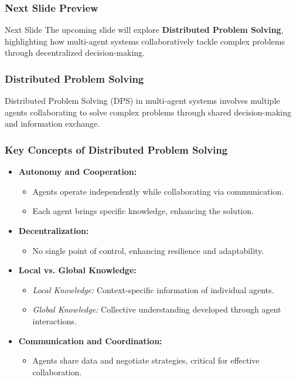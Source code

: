 \documentclass[aspectratio=169]{beamer}
\begin{document}
\begin{frame}[fragile]
    \frametitle{Next Slide Preview}
    \begin{block}{Next Slide}
        The upcoming slide will explore \textbf{Distributed Problem Solving}, highlighting how multi-agent systems collaboratively tackle complex problems through decentralized decision-making.
    \end{block}
\end{frame}

\begin{frame}[fragile]
    \frametitle{Distributed Problem Solving}
    Distributed Problem Solving (DPS) in multi-agent systems involves multiple agents collaborating to solve complex problems through shared decision-making and information exchange.
\end{frame}

\begin{frame}[fragile]
    \frametitle{Key Concepts of Distributed Problem Solving}
    \begin{itemize}
        \item \textbf{Autonomy and Cooperation:}
        \begin{itemize}
            \item Agents operate independently while collaborating via communication.
            \item Each agent brings specific knowledge, enhancing the solution.
        \end{itemize}

        \item \textbf{Decentralization:}
        \begin{itemize}
            \item No single point of control, enhancing resilience and adaptability.
        \end{itemize}

        \item \textbf{Local vs. Global Knowledge:}
        \begin{itemize}
            \item \textit{Local Knowledge:} Context-specific information of individual agents.
            \item \textit{Global Knowledge:} Collective understanding developed through agent interactions.
        \end{itemize}

        \item \textbf{Communication and Coordination:}
        \begin{itemize}
            \item Agents share data and negotiate strategies, critical for effective collaboration.
        \end{itemize}
    \end{itemize}
\end{frame}
\end{document}
